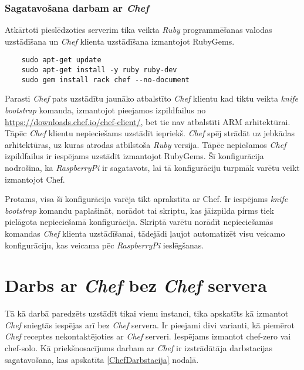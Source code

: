 \subsubsection{Sagatavošana darbam ar \textit{Chef}}
Atkārtoti pieslēdzoties serverim tika veikta \textit{Ruby} programmēšanas valodas uzstādīšana un \textit{Chef} klienta uzstādīšana izmantojot RubyGems.
\begin{lstlisting}
	sudo apt-get update
	sudo apt-get install -y ruby ruby-dev
	sudo gem install rack chef --no-document
\end{lstlisting}
Parasti \textit{Chef} pats uzstādītu jaunāko atbalstīto \textit{Chef} klientu kad tiktu veikta \textit{knife bootstrap} komanda, izmantojot pieejamos izpildfailus no \url{https://downloads.chef.io/chef-client/}, bet tie nav atbalstīti ARM arhitektūrai. Tāpēc \textit{Chef} klientu nepieciešams uzstādīt iepriekš. \textit{Chef} spēj strādāt uz jebkādas arhitektūras, uz kuras atrodas atbilstoša \textit{Ruby} versija. Tāpēc nepiešamos \textit{Chef} izpildfailus ir iespējams uzstādīt izmantojot RubyGems. Šī konfigurācija nodrošina, ka \textit{RaspberryPi} ir sagatavots, lai tā konfigurāciju turpmāk varētu veikt izmantojot Chef.

Protams, visa šī konfigurācija varēja tikt aprakstīta ar Chef. Ir iespējams \textit{knife bootstrap} komandu paplašināt, norādot tai skriptu, kas jāizpilda pirms tiek pielāgota nepieciešamā konfigurācija. Skriptā varētu norādīt nepieciešamās komandas \textit{Chef} klienta uzstādīšanai, tādejādi ļaujot automatizēt visu veicamo konfigurāciju, kas veicama pēc \textit{RaspberryPi} ieslēgšanas.


\section{Darbs ar \textit{Chef} bez \textit{Chef} servera}
Tā kā darbā paredzēts uzstādīt tikai vienu instanci, tika apskatīts kā izmantot \textit{Chef} sniegtās iespējas arī bez \textit{Chef} servera. Ir pieejami divi varianti, kā piemērot \textit{Chef} receptes nekontaktējoties ar \textit{Chef} serveri. Iespējams izmantot chef-zero vai chef-solo.
Kā priekšnosacījums darbam ar \textit{Chef} ir izstrādātāja darbstacijas sagatavošana, kas apskatīta \ref{ChefDarbstacija} nodaļā.

